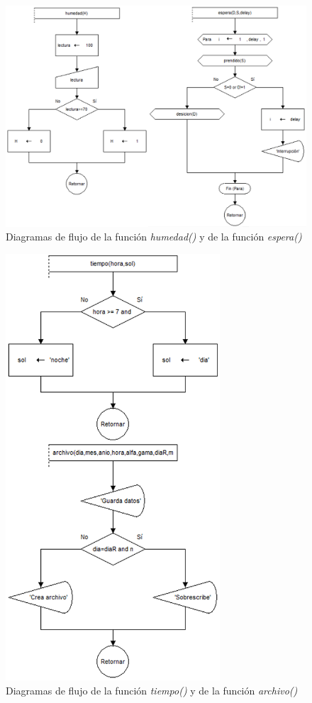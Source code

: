 \begin{figure}[H]
	\centering
	\includegraphics[width=\columnwidth]{imagenes/DF_humedadyespera}
	\caption{Diagramas de flujo de la función \textit{humedad()} y de la función \textit{espera()}}
	\label{fig:dia_fluj5}
\end{figure}

\begin{figure}[H]
	\centering
	\includegraphics[width=8cm]{imagenes/DF_tiempoyarchivo}
	\caption{Diagramas de flujo de la función \textit{tiempo()} y de la función \textit{archivo()}}
	\label{fig:dia_fluj6}
\end{figure}


